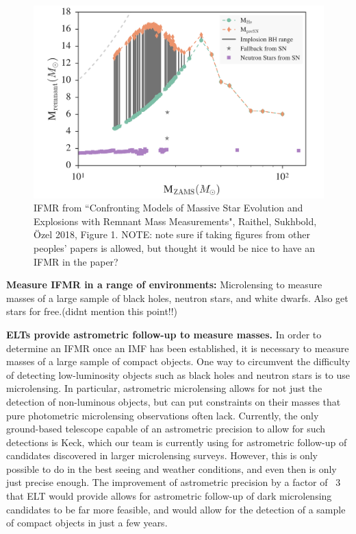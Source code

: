 \documentclass[11pt]{article}
\begin{document}
\begin{figure}
    \centering
    \includegraphics[scale=0.4]{IFMR_raithel.png}
    \caption{IFMR from ``Confronting Models of Massive Star Evolution and Explosions with Remnant Mass Measurements", Raithel, Sukhbold, \"{O}zel 2018, Figure 1. NOTE: note sure if taking figures from other peoples' papers is allowed, but thought it would be nice to have an IFMR in the paper?}
\end{figure}

\textbf{Measure IFMR in a range of environments:}
Microlensing to measure masses of a large sample of black holes, neutron stars, and white dwarfs.
Also get stars for free.(didnt mention this point!!)

\textbf{ELTs provide astrometric follow-up to measure masses.}
In order to determine an IFMR once an IMF has been established, it is necessary to measure masses of a large sample of compact objects. One way to circumvent the difficulty of detecting low-luminosity objects such as black holes and neutron stars is to use microlensing. In particular, astrometric microlensing allows for not just the detection of non-luminous objects, but can put constraints on their masses that pure photometric microlensing observations often lack. Currently, the only ground-based telescope capable of an astrometric precision to allow for such detections is Keck, which our team is currently using for astrometric follow-up of candidates discovered in larger microlensing surveys. However, this is only possible to do in the best seeing and weather conditions, and even then is only just precise enough.  The improvement of astrometric precision by a factor of ~3 that ELT would provide allows for astrometric follow-up of dark microlensing candidates to be far more feasible, and would allow for the detection of a sample of compact objects in just a few years.
\end{document}
